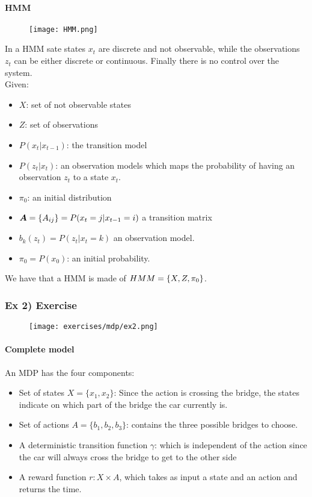 \paragraph{HMM}
\begin{figure}[H]
    \centering
    \texttt{[image: HMM.png]}
\end{figure}

In a HMM sate states $x_t$ are discrete and not observable, while the observations $z_t$ can be either discrete or continuous. Finally there is no control over the system.\\
Given:
\begin{itemize}
\item $X$: set of not observable states
\item $Z$: set of observations
\item $P(x_t|x_{t-1})$: the transition model 
\item $P(z_t|x_t)$: an observation models which maps the probability of having an observation $z_t$ to a state $x_t$.
\item $\pi_0$: an initial distribution
\item $\bm{A}=\lbrace{A_{ij}}\rbrace=P(x_t=j|x_{t-1}=i)$ a transition matrix
\item $b_k(z_t)=P(z_t|x_t=k)$ an observation model.
\item $\pi_0=P(x_0)$: an initial probability.
\end{itemize}
We have that a HMM is made of $HMM=\lbrace{X,Z,\pi_0}\rbrace$.

\subsubsection{Ex 2) Exercise}

\begin{figure}[H]
    \centering
    \texttt{[image: exercises/mdp/ex2.png]}
\end{figure}

\paragraph{Complete model}
An MDP has the four components:
\begin{itemize}
\item Set of states $X=\{x_1,x_2\}$: Since the action is crossing the bridge, the states indicate on which part of the bridge the car currently is.
\item Set of actions $A=\{b_1,b_2,b_3\}$: contains the three possible bridges to choose.
\item A deterministic transition function $\gamma$: which is independent of the action since the car will always cross the bridge to get to the other side
\item A reward function $r: X\times A$, which takes as input a state and an action and returns the time. 
\end{itemize}



